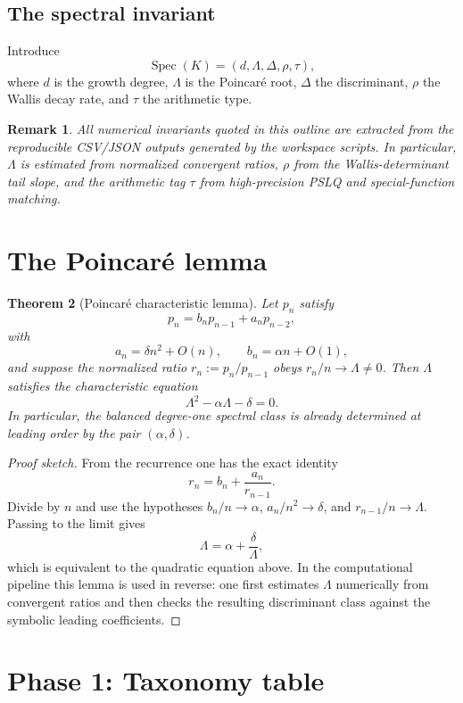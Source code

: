 \documentclass[11pt]{article}
\newtheorem{theorem}{Theorem}[section]
\newtheorem{remark}[theorem]{Remark}
\begin{document}
\subsection{The spectral invariant}
Introduce
\[
\operatorname{Spec}(K)=(d,\Lambda,\Delta,\rho,\tau),
\]
where $d$ is the growth degree, $\Lambda$ is the Poincar\'e root, $\Delta$ the discriminant, $\rho$ the Wallis decay rate, and $\tau$ the arithmetic type.

\begin{remark}
All numerical invariants quoted in this outline are extracted from the reproducible CSV/JSON outputs generated by the workspace scripts. In particular, $\Lambda$ is estimated from normalized convergent ratios, $\rho$ from the Wallis-determinant tail slope, and the arithmetic tag $\tau$ from high-precision PSLQ and special-function matching.
\end{remark}

\section{The Poincar\'e lemma}
\begin{theorem}[Poincar\'e characteristic lemma]\label{thm:poincare-outline}
Let $p_n$ satisfy
\[
  p_n=b_n p_{n-1}+a_n p_{n-2},
\]
with
\[
  a_n = \delta n^2 + O(n), \qquad b_n = \alpha n + O(1),
\]
and suppose the normalized ratio $r_n:=p_n/p_{n-1}$ obeys $r_n/n\to\Lambda\neq 0$. Then $\Lambda$ satisfies the characteristic equation
\[
  \Lambda^2 - \alpha \Lambda - \delta = 0.
\]
In particular, the balanced degree-one spectral class is already determined at leading order by the pair $(\alpha,\delta)$.
\end{theorem}

\begin{proof}[Proof sketch]
From the recurrence one has the exact identity
\[
  r_n = b_n + \frac{a_n}{r_{n-1}}.
\]
Divide by $n$ and use the hypotheses $b_n/n \to \alpha$, $a_n/n^2 \to \delta$, and $r_{n-1}/n \to \Lambda$. Passing to the limit gives
\[
  \Lambda = \alpha + \frac{\delta}{\Lambda},
\]
which is equivalent to the quadratic equation above. In the computational pipeline this lemma is used in reverse: one first estimates $\Lambda$ numerically from convergent ratios and then checks the resulting discriminant class against the symbolic leading coefficients.
\end{proof}

\section{Phase 1: Taxonomy table}
\end{document}
